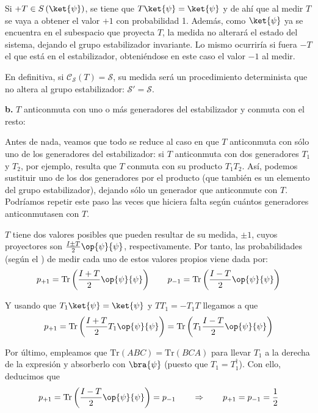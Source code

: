 \documentclass[11pt,a4paper,twoside,pdf]{article}
\numberwithin{equation}{section}
\begin{document}
			Si $+T\in S\left( \ket{\psi}\right) $, se tiene que $T\ket{\psi}=\ket{\psi}$ y de ahí que al medir $T$ se vaya a obtener el valor $+1$ con probabilidad 1. Además, como $\ket{\psi}$ ya se encuentra en el subespacio que proyecta $T$, la medida no alterará el estado del sistema, dejando el grupo estabilizador invariante. Lo mismo ocurriría si fuera $-T$ el que está en el estabilizador, obteniéndose en este caso el valor $-1$ al medir.
			
			En definitiva, si $\mathcal{C}_\mathcal{S}(T)=\mathcal{S}$, su medida será un procedimiento determinista que no altera al grupo estabilizador: $\mathcal{S}'=\mathcal{S}$.
			
			\begin{flushleft}\textbf{b.} $T$ anticonmuta con uno o más generadores del estabilizador y conmuta con el resto:	\end{flushleft} 
			
			Antes de nada, veamos que todo se reduce al caso en que $T$ anticonmuta con sólo uno de los generadores del estabilizador: si $T$ anticonmuta con dos generadores $T_1$ y $T_2$, por ejemplo, resulta que $T$ conmuta con su producto $T_1T_2$. Así, podemos sustituir uno de los dos generadores por el producto (que también es un elemento del grupo estabilizador), dejando sólo un generador que anticonmute con $T$. Podríamos repetir este paso las veces que hiciera falta según cuántos generadores anticonmutasen con $T$.
			
			$T$ tiene dos valores posibles que pueden resultar de su medida, $\pm1$, cuyos proyectores son $\frac{I\pm T}{2}\op{\psi}{\psi}$, respectivamente. Por tanto, las probabilidades (según el ) de medir cada uno de estos valores propios viene dada por:
			 	\begin{equation}
			 		p_{+1} = \text{Tr} \left( \frac{I+T}{2}\op{\psi}{\psi} \right) 	\qquad		p_{-1}=\text{Tr} \left( \frac{I-T}{2}\op{\psi}{\psi} \right) 
			 	\end{equation}
			 
			 Y usando que $T_1\ket{\psi}=\ket{\psi}$ y $TT_1=-T_1T$ llegamos a que 
			 	\begin{equation}
					p_{+1} = \text{Tr} \left( \frac{I+T}{2}T_1\op{\psi}{\psi} \right) = \text{Tr} \left( T_1 \frac{I-T}{2}\op{\psi}{\psi} \right)
				\end{equation}			 	
		
			Por último, empleamos que $\text{Tr}(ABC)=\text{Tr}(BCA)$ para llevar $T_1$ a la derecha de la expresión y absorberlo con $\bra{\psi}$ (puesto que $T_1=T_1^{\dagger}$). Con ello, deducimos que
				\begin{equation}
					p_{+1} = \text{Tr} \left( \frac{I-T}{2}\op{\psi}{\psi} \right) = p_{-1} 	\qquad		\Rightarrow		\qquad		p_{+1}=p_{-1}=\frac{1}{2}
				\end{equation}
	
\end{document}
